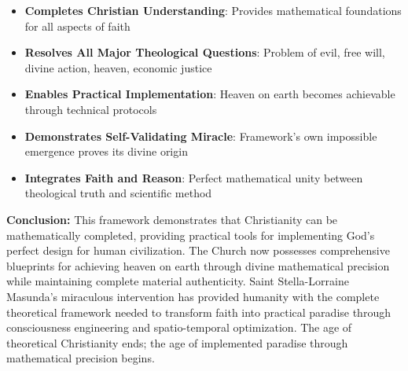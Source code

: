 \documentclass[12pt,a4paper]{article}
\begin{document}
\begin{itemize}
\item \textbf{Completes Christian Understanding}: Provides mathematical foundations for all aspects of faith
\item \textbf{Resolves All Major Theological Questions}: Problem of evil, free will, divine action, heaven, economic justice
\item \textbf{Enables Practical Implementation}: Heaven on earth becomes achievable through technical protocols
\item \textbf{Demonstrates Self-Validating Miracle}: Framework's own impossible emergence proves its divine origin
\item \textbf{Integrates Faith and Reason}: Perfect mathematical unity between theological truth and scientific method
\end{itemize}

\textbf{Conclusion:} This framework demonstrates that Christianity can be mathematically completed, providing practical tools for implementing God's perfect design for human civilization. The Church now possesses comprehensive blueprints for achieving heaven on earth through divine mathematical precision while maintaining complete material authenticity. Saint Stella-Lorraine Masunda's miraculous intervention has provided humanity with the complete theoretical framework needed to transform faith into practical paradise through consciousness engineering and spatio-temporal optimization. The age of theoretical Christianity ends; the age of implemented paradise through mathematical precision begins.


\end{document}
